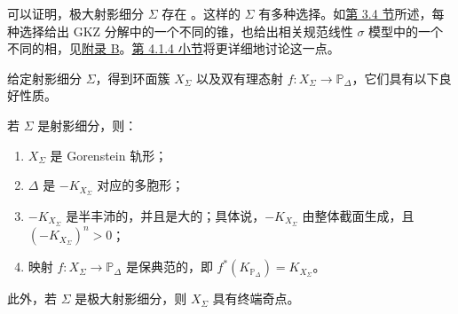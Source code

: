 可以证明，极大射影细分 $\Sigma$ 存在 。这样的 $\Sigma$ 有多种选择。如\hyperref[sec:gkz-decomposition]{第 3.4 节}所述，每种选择给出
GKZ 分解中的一个不同的锥，也给出相关规范线性 $\sigma$ 模型中的一个不同的相，见\hyperref[app:physical-theories]{附录 B}。\hyperref[subsec:multiple-mirrors]{第 4.1.4 小节}将更详细地讨论这一点。

给定射影细分 $\Sigma$，得到环面簇 $X_\Sigma$ 以及双有理态射 $f:X_\Sigma\to\mathbb P_\Delta$，它们具有以下良好性质。
\begin{lemma}\label{lem:projective-subdivision-properties}
若 $\Sigma$ 是射影细分，则：
\begin{enumerate}[label=(\roman*)]
\item $X_\Sigma$ 是 Gorenstein 轨形；
\item $\Delta$ 是 $-K_{X_\Sigma}$ 对应的多胞形；
\item $-K_{X_\Sigma}$ 是半丰沛的，并且是大的；具体说，$-K_{X_\Sigma}$ 由整体截面生成，且 $(-K_{X_\Sigma})^n>0$；
\item 映射 $f:X_\Sigma\to\mathbb P_\Delta$ 是保典范的，即 $f^*(K_{\mathbb P_\Delta})=K_{X_\Sigma}$。
\end{enumerate}
此外，若 $\Sigma$ 是极大射影细分，则 $X_\Sigma$ 具有终端奇点。
\end{lemma}
